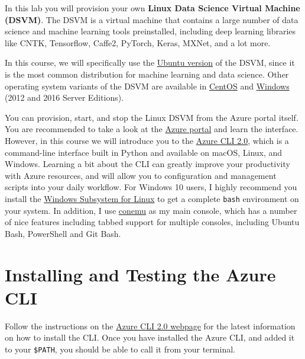 \documentclass[]{book}
\theoremstyle{definition}
\theoremstyle{definition}
\theoremstyle{definition}
\theoremstyle{remark}
\begin{document}
In this lab you will provision your own \textbf{Linux Data Science
Virtual Machine (DSVM)}. The DSVM is a virtual machine that contains a
large number of data science and machine learning tools preinstalled,
including deep learning libraries like CNTK, Tensorflow, Caffe2,
PyTorch, Keras, MXNet, and a lot more.

In this course, we will specifically use the
\href{https://docs.microsoft.com/en-us/azure/machine-learning/machine-learning-data-science-dsvm-ubuntu-intro}{Ubuntu
version} of the DSVM, since it is the most common distribution for
machine learning and data science. Other operating system variants of
the DSVM are available in
\href{https://docs.microsoft.com/en-us/azure/machine-learning/machine-learning-data-science-linux-dsvm-intro}{CentOS}
and
\href{https://docs.microsoft.com/en-us/azure/machine-learning/machine-learning-data-science-provision-vm}{Windows}
(2012 and 2016 Server Editions).

You can provision, start, and stop the Linux DSVM from the Azure portal
itself. You are recommended to take a look at the
\href{https://portal.azure.com/}{Azure portal} and learn the interface.
However, in this course we will introduce you to the
\href{https://docs.microsoft.com/en-us/cli/azure/overview}{Azure CLI
2.0}, which is a command-line interface built in Python and available on
macOS, Linux, and Windows. Learning a bit about the CLI can greatly
improve your productivity with Azure resources, and will allow you to
configuration and management scripts into your daily workflow. For
Windows 10 users, I highly recommend you install the
\href{https://msdn.microsoft.com/en-us/commandline/wsl/install_guide}{Windows
Subsystem for Linux} to get a complete \texttt{bash} environment on your
system. In addition, I use \href{https://conemu.github.io/}{conemu} as
my main console, which has a number of nice features including tabbed
support for multiple consoles, including Ubuntu Bash, PowerShell and Git
Bash.

\section{Installing and Testing the Azure
CLI}\label{installing-and-testing-the-azure-cli}

Follow the instructions on the
\href{https://docs.microsoft.com/en-us/cli/azure/install-azure-cli}{Azure
CLI 2.0 webpage} for the latest information on how to install the CLI.
Once you have installed the Azure CLI, and added it to your
\texttt{\$PATH}, you should be able to call it from your terminal.
\end{document}
